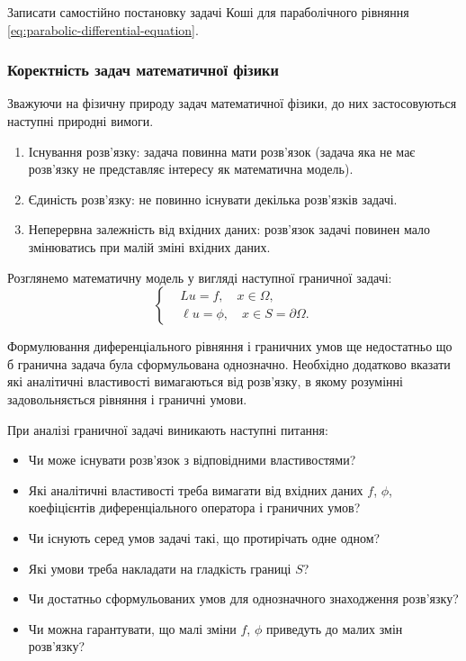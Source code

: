 \begin{exercise}
    Записати самостійно постановку задачі Коші для параболічного рівняння \eqref{eq:parabolic-differential-equation}.
\end{exercise}

\subsubsection{Коректність задач математичної фізики}

Зважуючи на фізичну природу задач математичної фізики, до них застосовуються наступні природні вимоги.
\begin{enumerate}
    \item Існування розв'язку: задача повинна мати розв'язок (задача яка не має розв'язку не представляє інтересу як математична модель).
    \item Єдиність розв’язку: не повинно існувати декілька розв'язків задачі.
    \item Неперервна залежність від вхідних даних: розв'язок задачі повинен мало змінюватись при малій зміні вхідних даних.
\end{enumerate}

Розглянемо математичну модель у вигляді наступної граничної задачі:
\begin{equation}
    \label{eq:boundary-problem}
    \left\{
        \begin{aligned}
            & L u = f, \quad x \in \Omega, \\
            & \ell u = \phi, \quad x \in S = \partial \Omega.
        \end{aligned}
    \right.
\end{equation}

Формулювання диференціального рівняння і граничних умов ще недостатньо що б гранична задача була сформульована однозначно. Необхідно додатково вказати які аналітичні властивості вимагаються від розв’язку, в якому розумінні задовольняється рівняння і граничні умови. \medskip

При аналізі граничної задачі виникають наступні питання:
\begin{itemize}
    \item Чи може існувати розв'язок з відповідними властивостями?
    \item Які аналітичні властивості треба вимагати від вхідних даних $f$, $\phi$, коефіцієнтів диференціального оператора і граничних умов?
    \item Чи існують серед умов задачі такі, що протирічать одне одном?
    \item Які умови треба накладати на гладкість границі $S$?
    \item Чи достатньо сформульованих умов для однозначного знаходження розв’язку?
    \item Чи можна гарантувати, що малі зміни $f$, $\phi$ приведуть до малих змін розв'язку?
\end{itemize}

